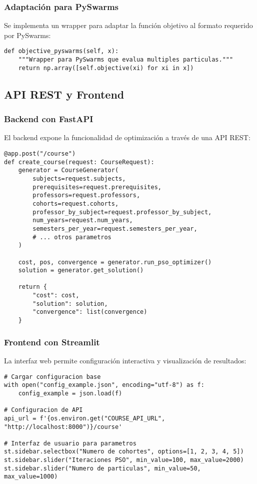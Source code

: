 \subsubsection{Adaptación para PySwarms}
Se implementa un wrapper para adaptar la función objetivo al formato requerido por PySwarms:

\begin{verbatim}
def objective_pyswarms(self, x):
    """Wrapper para PySwarms que evalua multiples particulas."""
    return np.array([self.objective(xi) for xi in x])
\end{verbatim}

\subsection{API REST y Frontend}

\subsubsection{Backend con FastAPI}
El backend expone la funcionalidad de optimización a través de una API REST:

\begin{verbatim}
@app.post("/course")
def create_course(request: CourseRequest):
    generator = CourseGenerator(
        subjects=request.subjects,
        prerequisites=request.prerequisites,
        professors=request.professors,
        cohorts=request.cohorts,
        professor_by_subject=request.professor_by_subject,
        num_years=request.num_years,
        semesters_per_year=request.semesters_per_year,
        # ... otros parametros
    )
    
    cost, pos, convergence = generator.run_pso_optimizer()
    solution = generator.get_solution()
    
    return {
        "cost": cost,
        "solution": solution,
        "convergence": list(convergence)
    }
\end{verbatim}

\subsubsection{Frontend con Streamlit}
La interfaz web permite configuración interactiva y visualización de resultados:

\begin{verbatim}
# Cargar configuracion base
with open("config_example.json", encoding="utf-8") as f:
    config_example = json.load(f)

# Configuracion de API
api_url = f'{os.environ.get("COURSE_API_URL", "http://localhost:8000")}/course'

# Interfaz de usuario para parametros
st.sidebar.selectbox("Numero de cohortes", options=[1, 2, 3, 4, 5])
st.sidebar.slider("Iteraciones PSO", min_value=100, max_value=2000)
st.sidebar.slider("Numero de particulas", min_value=50, max_value=1000)
\end{verbatim}

